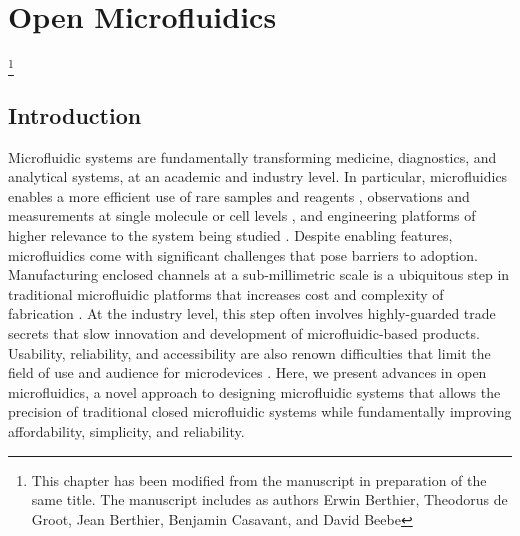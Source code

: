 \chapter{Open Microfluidics}\footnote{This chapter has been modified from the manuscript in preparation of the same title. The manuscript includes as authors Erwin Berthier, Theodorus de Groot, Jean Berthier, Benjamin Casavant, and David Beebe}
\label{Chap:OpenMicrofluidics}


\section{Introduction}
Microfluidic systems are fundamentally transforming medicine, diagnostics, and analytical systems, at an academic and industry level. In particular, microfluidics enables a more efficient use of rare samples and reagents \cite{Burns1998, Ingham2007, Song2006a, Thorsen2002a}, observations and measurements at single molecule or cell levels \cite{Kopp1998, Hong2012}, and engineering platforms of higher relevance to the system being studied \cite{Berthier2013,Huh2010a,Jeon2015,Meyvantsson2008,Sackmann2014a,Domenech2009}. Despite enabling features, microfluidics come with significant challenges that pose barriers to adoption. Manufacturing enclosed channels at a sub-millimetric scale is a ubiquitous step in traditional microfluidic platforms that increases cost and complexity of fabrication \cite{Guckenberger2015b,Sackmann2014}. At the industry level, this step often involves highly-guarded trade secrets that slow innovation and development of microfluidic-based products. Usability, reliability, and accessibility are also renown difficulties that limit the field of use and audience for microdevices \cite{Casavant2013, Sackmann2014}. Here, we present advances in open microfluidics, a novel approach to designing microfluidic systems that allows the precision of traditional closed microfluidic systems while fundamentally improving affordability, simplicity, and reliability.

